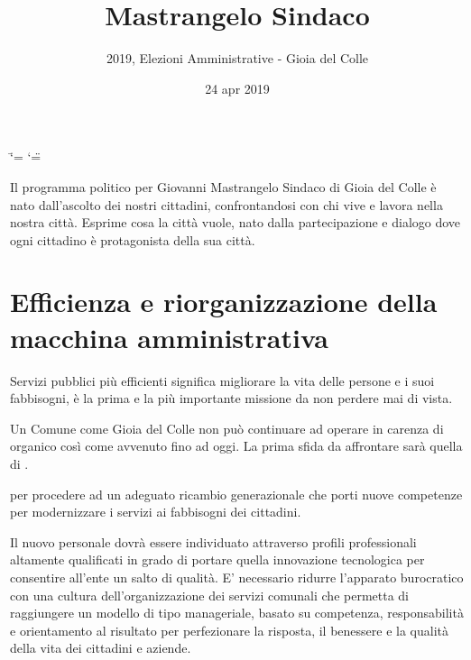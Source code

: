 \documentclass[a4paper,14pt,italian]{sphinxmanual}
\title{Mastrangelo Sindaco}
\date{24 apr 2019}
\author{2019, Elezioni Amministrative - Gioia del Colle}
\begin{document}
\ifdefined\shorthandoff
  \ifnum\catcode`\=\string=\active\shorthandoff{=}\fi
  \ifnum\catcode`\"=\active{}\fi
\fi

\pagestyle{empty}
\sphinxmaketitle
\pagestyle{plain}
\sphinxtableofcontents
\pagestyle{normal}
\label{\detokenize{index::doc}}


Il programma politico per Giovanni Mastrangelo Sindaco di Gioia del Colle è nato dall’ascolto dei nostri cittadini, confrontandosi con chi vive e lavora nella nostra città.
Esprime cosa la città vuole, nato dalla partecipazione e dialogo dove ogni cittadino è protagonista della sua città.



\chapter{Efficienza e riorganizzazione della macchina amministrativa}
\label{\detokenize{comune_efficiente:efficienza-e-riorganizzazione-della-macchina-amministrativa}}\label{\detokenize{comune_efficiente::doc}}

Servizi pubblici più efficienti significa migliorare la vita delle persone e i suoi fabbisogni, è la prima e la più importante missione da non perdere mai di vista.

Un Comune come Gioia del Colle non può continuare ad operare in carenza di organico così come avvenuto fino ad oggi.
La prima sfida da affrontare sarà quella di .

 per procedere ad un adeguato ricambio generazionale che porti nuove competenze per modernizzare i servizi ai fabbisogni dei cittadini.

Il nuovo personale dovrà essere individuato attraverso profili professionali altamente qualificati in grado di portare quella innovazione tecnologica per consentire all’ente un salto di qualità.
E’ necessario ridurre l’apparato burocratico con una cultura dell’organizzazione dei servizi comunali che permetta di raggiungere un modello di tipo manageriale, basato su competenza, responsabilità e orientamento al risultato per perfezionare la risposta, il benessere e la qualità della vita dei cittadini e aziende.
\end{document}
